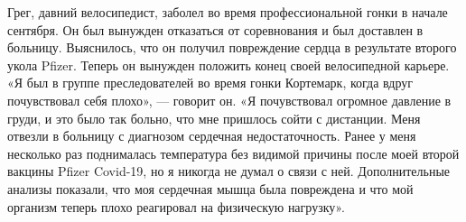 Грег, давний велосипедист, заболел во время профессиональной гонки в начале
сентября. Он был вынужден отказаться от соревнования и был доставлен в
больницу. Выяснилось, что он получил повреждение сердца в результате второго
укола Pfizer. Теперь он вынужден положить конец своей велосипедной карьере. «Я
был в группе преследователей во время гонки Кортемарк, когда вдруг почувствовал
себя плохо», — говорит он. «Я почувствовал огромное давление в груди, и это было
так больно, что мне пришлось сойти с дистанции. Меня отвезли в больницу с
диагнозом сердечная недостаточность. Ранее у меня несколько раз поднималась
температура без видимой причины после моей второй вакцины Pfizer Covid-19, но я
никогда не думал о связи с ней. Дополнительные анализы показали, что моя
сердечная мышца была повреждена и что мой организм теперь плохо реагировал на
физическую нагрузку».

